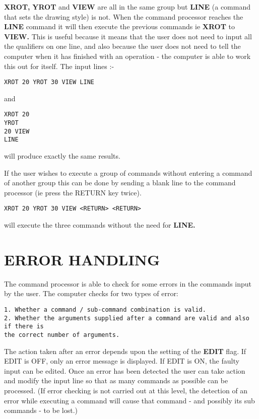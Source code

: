 \documentclass[10pt,a4paper]{report}
\begin{document}
{\bf XROT,} {\bf YROT}  and {\bf VIEW}  are all in the same group but {\bf LINE}
 (a command that
sets the drawing style) is not. When the command processor reaches the
{\bf LINE} command it will then execute the previous commands ie {\bf XROT}
to {\bf VIEW.}
This is useful because it means that the user does not need to input all
the qualifiers on one line, and also because the user does not need to
tell the computer when it has finished with an operation - the computer
is able to work this out for itself. The input lines :-

\small\begin{verbatim}
XROT 20 YROT 30 VIEW LINE
\end{verbatim}\normalsize


and
\small\begin{verbatim}
XROT 20
YROT
20 VIEW
LINE
\end{verbatim}\normalsize


will produce exactly the same results.


If the user wishes to execute a group of commands without entering a
command of another group this can be done by sending a blank line to the
command processor (ie press the RETURN key twice).
\small\begin{verbatim}
XROT 20 YROT 30 VIEW <RETURN> <RETURN>
\end{verbatim}\normalsize


will execute the three commands without the need for {\bf LINE.}
\section{ERROR HANDLING}


The command processor is able to check for some errors in the commands
input by the user. The computer checks for two types of error:



\small\begin{verbatim}
1. Whether a command / sub-command combination is valid.
2. Whether the arguments supplied after a command are valid and also if there is
the correct number of arguments.
\end{verbatim}\normalsize




The action taken after an error depends upon the setting of the
{\bf EDIT} flag. If EDIT is OFF, only an error message is displayed.
If EDIT is ON, the faulty input can be edited.
Once an error has been detected the
user can take action and modify the input line so that as many commands
as possible can be processed. (If error checking is not carried out at
this level, the detection of an error while executing a command will
cause that command - and possibly its sub commands - to be lost.)
\end{document}
